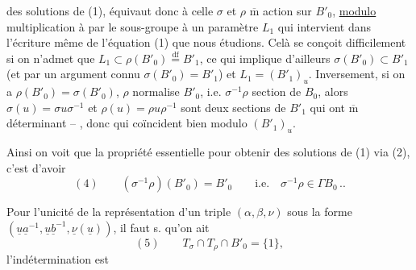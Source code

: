 


des solutions de (1), équivaut donc à celle
  $\sigma$ et $\rho$
 $\overline{\mathrm m}$ action
sur $B'_0$, \uline{modulo} multiplication à  par
 le sous-groupe 
 à un paramètre $L_1$ qui
intervient dans l'écriture même de l'équation (1) que nous étudions.
Celà se conçoit difficilement si on n'admet que
$L_1\subset\rho(B'_0)\overset{\mathrm{df}}=B'_1$, ce qui implique d'ailleurs
$\sigma(B'_0)\subset B'_1$ (et par un argument connu $\sigma(B'_0)=B'_1$)
et $L_1=(B'_1)_u$. Inversement, si on a
$\rho(B'_0)=\sigma(B'_0)$, 
\deleted{$\unsure{\rho(-)}$}$\rho$ normalise $B'_0$,
 i.e. $\sigma^{-1}\rho$ section de $B_0$, alors
$\sigma(u)=\sigma u\sigma^{-1}$ et $\rho(u)=\rho u\rho^{-1}$ sont deux sections
de $B'_1$ qui ont $\overline{\mathrm m}$ déterminant -- ,
donc qui coïncident bien modulo $(B'_1)_u$.

Ainsi on voit que la propriété essentielle pour obtenir des solutions de (1) via (2),
c'est d'avoir
\[
(4)\qquad (\sigma^{-1}\rho)(B'_0)=B'_0\qquad\text{i.e.}\quad
\sigma^{-1}\rho\in\Gamma B_0\, ..
\]

Pour l'unicité de la représentation d'un triple $(\alpha,\beta,\nu)$ sous la forme
$(\underline u\underline a^{-1},\underline u\underline b^{-1},\underline\nu(\underline u))$,
il faut   s. qu'on ait
\[
(5)\qquad T_\sigma\cap T_\rho\cap B'_0=\{1\},
\]
l'indétermination est

